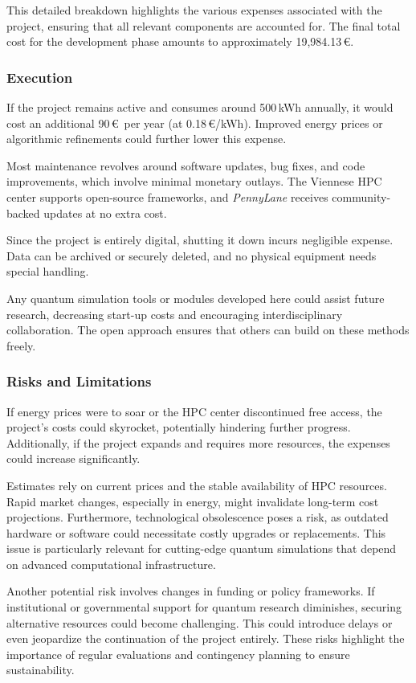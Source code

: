 This detailed breakdown highlights the various expenses associated with the project, ensuring that all relevant components are accounted for. The final total cost for the development phase amounts to approximately 19,984.13\,\euro.

\subsubsection{Execution}
If the project remains active and consumes around 500\,kWh annually, it would cost an additional 90\,\euro\ per year (at 0.18\,\euro/kWh). Improved energy prices or algorithmic refinements could further lower this expense.

Most maintenance revolves around software updates, bug fixes, and code improvements, which involve minimal monetary outlays. The Viennese HPC center supports open-source frameworks, and \emph{PennyLane} receives community-backed updates at no extra cost.

Since the project is entirely digital, shutting it down incurs negligible expense. Data can be archived or securely deleted, and no physical equipment needs special handling.

Any quantum simulation tools or modules developed here could assist future research, decreasing start-up costs and encouraging interdisciplinary collaboration. The open approach ensures that others can build on these methods freely.


\subsubsection{Risks and Limitations}
If energy prices were to soar or the HPC center discontinued free access, the project’s costs could skyrocket, potentially hindering further progress. Additionally, if the project expands and requires more resources, the expenses could increase significantly.

Estimates rely on current prices and the stable availability of HPC resources. Rapid market changes, especially in energy, might invalidate long-term cost projections. Furthermore, technological obsolescence poses a risk, as outdated hardware or software could necessitate costly upgrades or replacements. This issue is particularly relevant for cutting-edge quantum simulations that depend on advanced computational infrastructure.

Another potential risk involves changes in funding or policy frameworks. If institutional or governmental support for quantum research diminishes, securing alternative resources could become challenging. This could introduce delays or even jeopardize the continuation of the project entirely. These risks highlight the importance of regular evaluations and contingency planning to ensure sustainability.

